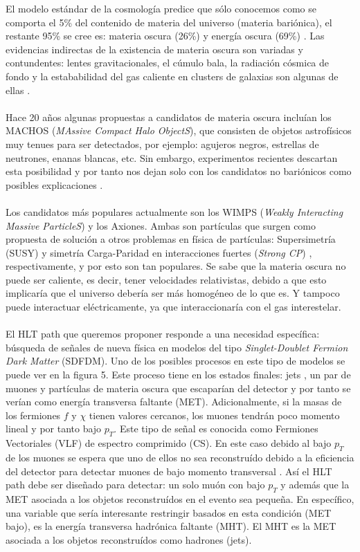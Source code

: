 El modelo estándar de la cosmología predice que sólo conocemos como se comporta el 5\% del contenido de materia del universo (materia bariónica), el restante 95\% se cree es: materia oscura (26\%) y energía oscura (69\%) \cite{Ade:2015xua}. Las evidencias indirectas de la existencia de materia oscura son variadas y contundentes: lentes gravitacionales, el cúmulo bala, la radiación cósmica de fondo y la estababilidad del gas caliente en clusters de galaxias son algunas de ellas \cite{Freese:2017idy}. 
\\
\\
Hace 20 años algunas propuestas a candidatos de materia oscura incluían los MACHOS (\textit{MAssive Compact Halo ObjectS}), que consisten de objetos astrofísicos muy tenues para ser detectados, por ejemplo: agujeros negros, estrellas de neutrones, enanas blancas, etc. Sin embargo, experimentos recientes descartan esta posibilidad y por tanto nos dejan solo con los candidatos no bariónicos como posibles explicaciones \cite{Freese:1999ge,Fields:1999ar}.
\\
\\
Los candidatos más populares actualmente son los WIMPS (\textit{Weakly Interacting Massive ParticleS}) y los Axiones. Ambas son partículas que surgen como propuesta de solución a otros problemas en física de partículas: Supersimetría (SUSY) \cite{SUSY} y simetría Carga-Paridad en interacciones fuertes (\textit{Strong CP}) \cite{StrongCP}, respectivamente, y por esto son tan populares. Se sabe que la materia oscura no puede ser caliente, es decir, tener velocidades relativistas, debido a que esto implicaría que el universo debería ser más homogéneo de lo que es. Y tampoco puede interactuar eléctricamente, ya que interaccionaría con el gas interestelar. 
\\
\\
El HLT path que queremos proponer responde a una necesidad específica: búsqueda de señales de nueva física en modelos del tipo \textit{Singlet-Doublet Fermion Dark Matter} (SDFDM)\cite{1475-7516-2016-03-048}. Uno de los posibles procesos en este tipo de modelos se puede ver en la figura 5. Este proceso tiene en los estados finales: jets , un par de muones y partículas de materia oscura que escaparían del detector y por tanto se verían como energía transversa faltante (MET). Adicionalmente, si la masas de los fermiones $f$ y $\chi$ tienen valores cercanos, los muones tendrán poco momento lineal y por tanto bajo $p_T$. Este tipo de señal es conocida como Fermiones Vectoriales (VLF) de espectro comprimido (CS). En este caso debido al bajo $p_T$ de los muones se espera que uno de ellos no sea reconstruído debido a la eficiencia del detector para detectar muones de bajo momento transversal \cite{Chatrchyan:2012xi}. Así el HLT path debe ser diseñado para detectar: un solo muón con bajo $p_T$ y además que la MET asociada a los objetos reconstruídos en el evento sea pequeña. En específico, una variable que sería interesante restringir basados en esta condición (MET bajo), es la energía transversa hadrónica faltante (MHT). El MHT es la MET asociada a los objetos reconstruídos como hadrones (jets).
